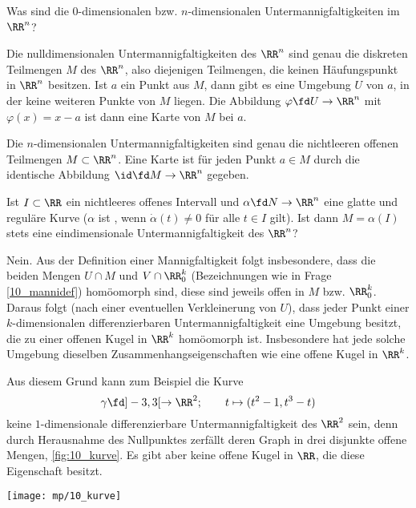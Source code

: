 \begin{frage}
  Was sind die $0$-dimensionalen bzw. $n$-dimensionalen 
  Untermannigfaltigkeiten im $\RR^n$?
\end{frage}

\begin{antwort}
  Die nulldimensionalen Untermannigfaltigkeiten des $\RR^n$ sind 
  genau die diskreten Teilmengen $M$ des $\RR^n$, 
  also diejenigen Teilmengen, die keinen Häufungspunkt 
  in $\RR^n$ besitzen. Ist $a$ ein Punkt aus $M$, dann gibt es eine Umgebung 
  $U$ von $a$, in der keine weiteren Punkte von $M$ liegen. Die Abbildung 
  $\varphi \fd U \to \RR^n$ mit $\varphi(x)=x-a$ ist dann eine Karte 
  von $M$ bei $a$. 

  Die $n$-dimensionalen Untermannigfaltigkeiten sind genau die 
  nichtleeren offenen Teilmengen $M \subset \RR^n$. Eine Karte ist 
  für jeden Punkt $a \in M$ durch die identische Abbildung 
  $\id \fd M \to \RR^n$ gegeben.  
  \AntEnd
\end{antwort}

\begin{frage}\label{10_nomanni}
  Ist $I\subset \RR$ ein nichtleeres offenes Intervall und 
  $\alpha\fd N\to \RR^n$ eine glatte und reguläre Kurve 
  ($\alpha$ ist , wenn $\dot{\alpha}(t)\not=0$ für alle 
  $t\in I$ gilt). Ist dann $M=\alpha(I)$ stets eine eindimensionale 
  Untermannigfaltigkeit des $\RR^n$?
\end{frage}

\begin{antwort}
  Nein. Aus der Definition einer Mannigfaltigkeit folgt 
  insbesondere, dass die beiden Mengen $U\cap M$ und 
  $V \cap \RR_0^k$ (Bezeichnungen wie in Frage \ref{10_mannidef})
  homöomorph sind, diese sind jeweils offen in $M$ 
  bzw. $\RR_0^k$. Daraus folgt (nach einer eventuellen Verkleinerung 
  von $U$), dass jeder Punkt einer $k$-dimensionalen differenzierbaren 
  Untermannigfaltigkeit eine Umgebung besitzt, die zu einer offenen 
  Kugel in $\RR^k$ homöomorph ist. Insbesondere hat jede solche 
  Umgebung dieselben Zusammenhangseigenschaften wie eine offene Kugel 
  in $\RR^k$. 

  Aus diesem Grund kann zum Beispiel die Kurve 
  \[
  \gamma\fd ]-3,3[ \to \RR^2; \qquad t \mapsto (t^2-1, t^3-t )
  \]
  keine $1$-dimensionale differenzierbare Untermannigfaltigkeit des 
  $\RR^2$ sein, denn durch Herausnahme des Nullpunktes zerfällt 
  deren Graph in drei disjunkte offene Mengen, \sieheAbbildung\ref{fig:10_kurve}. 
  Es gibt aber keine offene Kugel in $\RR$, die diese Eigenschaft besitzt. 
  \AntEnd

  \begin{center}
    \texttt{[image: mp/10\_kurve]}
    \label{fig:10_kurve}
  \end{center}
\end{antwort}

